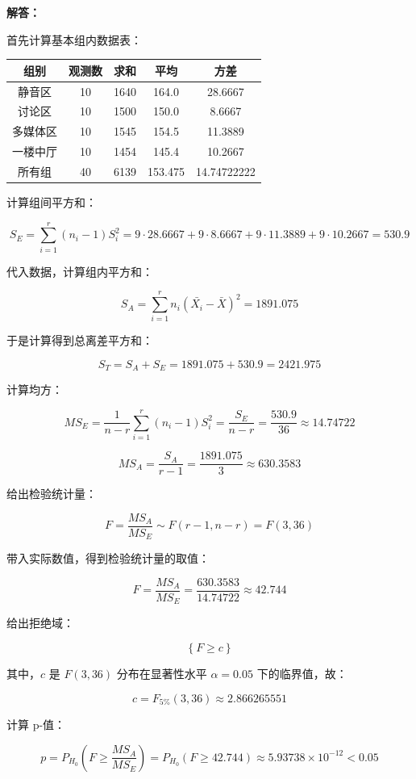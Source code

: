\documentclass[12pt,a4paper]{article}
\begin{document}
\begin{answerbox}
\textbf{解答：}

首先计算基本组内数据表：

\begin{center}
\begin{tabular}{ccccc}
\toprule
组别 & 观测数 & 求和 & 平均 & 方差 \\
\midrule
静音区   & 10 & 1640 & 164.0 & 28.6667 \\
讨论区   & 10 & 1500 & 150.0 & 8.6667 \\
多媒体区 & 10 & 1545 & 154.5 & 11.3889 \\
一楼中厅 & 10 & 1454 & 145.4 & 10.2667 \\
所有组   & 40 & 6139 & 153.475 & 14.74722222 \\
\bottomrule
\end{tabular}
\end{center}

计算组间平方和：

$$
S_E = \sum_{i=1}^{r} (n_i - 1) S_i^2 = 9 \cdot 28.6667 + 9 \cdot 8.6667 + 9 \cdot 11.3889 + 9 \cdot 10.2667 = 530.9
$$

代入数据，计算组内平方和：

$$
S_A = \sum_{i=1}^{r} n_i (\bar{X_i} - \bar{X})^2 = 1891.075
$$

于是计算得到总离差平方和：

$$
S_T = S_A + S_E = 1891.075 + 530.9 = 2421.975
$$

计算均方：

$$
MS_E = \frac{1}{n-r} \sum_{i= 1}^{r} (n_i - 1) S_i^2 = \frac{S_E}{n-r} = \frac{530.9}{36} \approx 14.74722
$$

$$
MS_A = \frac{S_A}{r-1} = \frac{1891.075}{3} \approx 630.3583
$$

给出检验统计量：

$$
F = \frac{MS_A}{MS_E} \sim F(r-1, n-r) = F(3, 36)
$$

带入实际数值，得到检验统计量的取值：

$$
F = \frac{MS_A}{MS_E} = \frac{630.3583}{14.74722} \approx 42.744
$$

给出拒绝域：

$$
\left\{F \geq c\right\}
$$

其中，$c$ 是 $F(3, 36)$ 分布在显著性水平 $\alpha=0.05$ 下的临界值，故：

$$
c = F_{5\%}(3, 36) \approx 2.866265551
$$

计算 p-值：

$$
p = P_{H_0}\left(F \geq \frac{MS_A}{MS_E}\right) = P_{H_0}\left(F \geq 42.744\right) \approx 5.93738 \times 10^{-12} < 0.05
$$


\end{answerbox}
\end{document}
